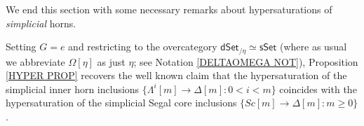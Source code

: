 \documentclass[a4paper,10pt
 ,draft
]{article}%
\begin{document}
%

We end this section with some necessary remarks about hypersaturations of \textit{simplicial} horns.


\begin{remark}\label{SLICE REM}
	Setting $G=e$ and restricting to the overcategory
	$\mathsf{dSet}_{/\eta} \simeq \mathsf{sSet}$ 
	(where as usual we abbreviate $\Omega[\eta]$ as just $\eta$; see Notation \ref{DELTAOMEGA NOT}),
	Proposition \ref{HYPER PROP}
	recovers the well known claim that 
	the hypersaturation of the simplicial inner horn inclusions
	$\{\Lambda^i[m] \to \Delta[m] \colon 0< i < m\}$
	coincides with the hypersaturation of the simplicial Segal core inclusions
	$\{Sc[m] \to \Delta[m]\colon m \geq 0\}$.
\end{remark}
\end{document}
